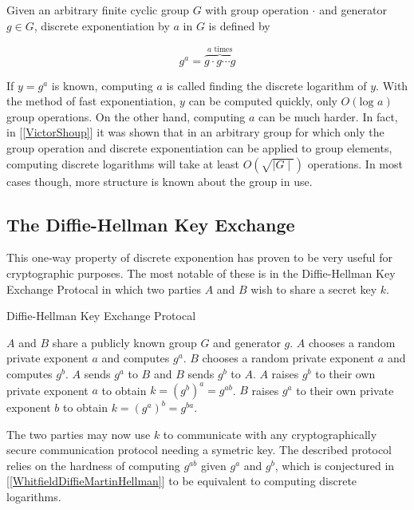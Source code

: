 
Given an arbitrary finite cyclic group $G$ with group operation $\cdot$ and generator $g \in G$, discrete exponentiation by $a$ in $G$ is defined by 

$$
g^a = \overbrace{g \cdot g \cdots g}^{a \text{ times}}
$$

If $y = g^a$ is known, computing $a$ is called finding the discrete logarithm of $y$. With the method of fast exponentiation, $y$ can be computed quickly, only $O(\text{log } a)$ group operations. On the other hand, computing $a$ can be much harder. In fact, in [\ref{VictorShoup}] it was shown that in an arbitrary group for which only the group operation and discrete exponentiation can be applied to group elements, computing discrete logarithms will take at least $O(\sqrt{\mid G \mid})$ operations. In most cases though, more structure is known about the group in use.  

\subsection{The Diffie-Hellman Key Exchange}

This one-way property of discrete exponention has proven to be very useful for cryptographic purposes. The most notable of these is in the Diffie-Hellman Key Exchange Protocal in which two parties $A$ and $B$ wish to share a secret key $k$.

\begin{algorithm} 
	\caption{Diffie-Hellman Key Exchange Protocal}
	\begin{algorithmic}[1]
		\State $A$ and $B$ share a publicly known group $G$ and generator $g$.
		\State $A$ chooses a random private exponent $a$ and computes $g^a$.
		\State $B$ chooses a random private exponent $a$ and computes $g^b$.
		\State $A$ sends $g^a$ to $B$ and $B$ sends $g^b$ to $A$. 
		\State $A$ raises $g^b$ to their own private exponent $a$ to obtain $k = (g^b)^a = g^{ab}$.
		\State $B$ raises $g^a$ to their own private exponent $b$ to obtain $k = (g^a)^b = g^{ba}$.
	\end{algorithmic} 
\end{algorithm}  


The two parties may now use $k$ to communicate with any cryptographically secure communication protocol needing a symetric key. The described protocol relies on the hardness of computing $g^{ab}$ given $g^a$ and $g^b$, which is conjectured in [\ref{WhitfieldDiffieMartinHellman}] to be equivalent to computing discrete logarithms.


